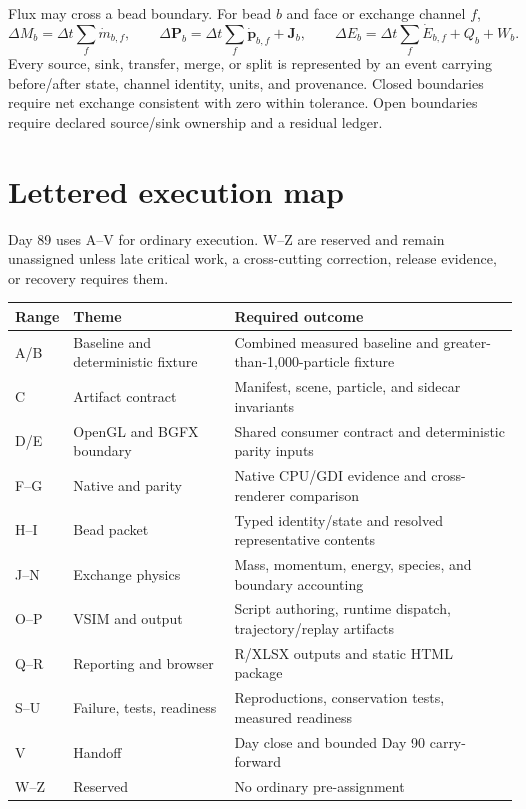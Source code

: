 \documentclass[10pt]{article}
\begin{document}
Flux may cross a bead boundary. For bead $b$ and face or exchange channel $f$,
\[
\Delta M_b = \Delta t\sum_f \dot m_{b,f},\qquad
\Delta\mathbf{P}_b = \Delta t\sum_f \dot{\mathbf p}_{b,f}+\mathbf{J}_b,\qquad
\Delta E_b = \Delta t\sum_f \dot E_{b,f}+Q_b+W_b.
\]
Every source, sink, transfer, merge, or split is represented by an event carrying before/after state, channel identity, units, and provenance. Closed boundaries require net exchange consistent with zero within tolerance. Open boundaries require declared source/sink ownership and a residual ledger.

\newpage
\section*{Lettered execution map}
Day 89 uses A--V for ordinary execution. W--Z are reserved and remain unassigned unless late critical work, a cross-cutting correction, release evidence, or recovery requires them.

\begin{center}
\begin{tabularx}{\textwidth}{@{}llX@{}}
\toprule
Range & Theme & Required outcome \\
\midrule
A/B & Baseline and deterministic fixture & Combined measured baseline and greater-than-1,000-particle fixture \\
C & Artifact contract & Manifest, scene, particle, and sidecar invariants \\
D/E & OpenGL and BGFX boundary & Shared consumer contract and deterministic parity inputs \\
F--G & Native and parity & Native CPU/GDI evidence and cross-renderer comparison \\
H--I & Bead packet & Typed identity/state and resolved representative contents \\
J--N & Exchange physics & Mass, momentum, energy, species, and boundary accounting \\
O--P & VSIM and output & Script authoring, runtime dispatch, trajectory/replay artifacts \\
Q--R & Reporting and browser & R/XLSX outputs and static HTML package \\
S--U & Failure, tests, readiness & Reproductions, conservation tests, measured readiness \\
V & Handoff & Day close and bounded Day 90 carry-forward \\
W--Z & Reserved & No ordinary pre-assignment \\
\bottomrule
\end{tabularx}
\end{center}
\end{document}
